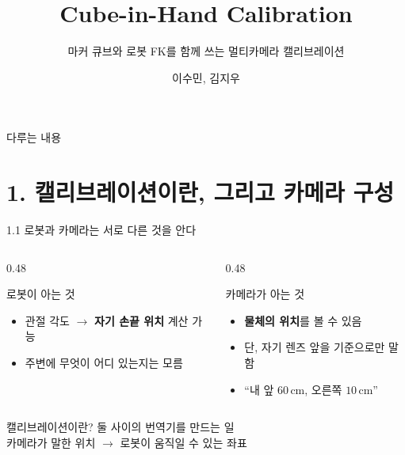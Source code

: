 \documentclass[aspectratio=169,11pt]{beamer}
\title[Cube-in-Hand Calibration]{Cube-in-Hand Calibration}
\subtitle{마커 큐브와 로봇 FK를 함께 쓰는 멀티카메라 캘리브레이션}
\author{이수민, 김지우}
\institute{}
\date{}
\begin{document}
\begin{frame}
  \titlepage
\end{frame}

\begin{frame}{다루는 내용}
  \tableofcontents
\end{frame}

\section{1. 캘리브레이션이란, 그리고 카메라 구성}

\begin{frame}{1.1 로봇과 카메라는 서로 다른 것을 안다}
  \begin{columns}[T]
    \begin{column}{0.48\textwidth}
      \begin{block}{로봇이 아는 것}
        \begin{minipage}[t][26mm][t]{\linewidth}
          \begin{itemize}
            \item 관절 각도 $\rightarrow$ \textbf{자기 손끝 위치} 계산 가능
            \item 주변에 무엇이 어디 있는지는 모름
          \end{itemize}
        \end{minipage}
      \end{block}
    \end{column}
    \begin{column}{0.48\textwidth}
      \begin{block}{카메라가 아는 것}
        \begin{minipage}[t][26mm][t]{\linewidth}
          \begin{itemize}
            \item \textbf{물체의 위치}를 볼 수 있음
            \item 단, 자기 렌즈 앞을 기준으로만 말함
            \item ``내 앞 $60\,\mathrm{cm}$, 오른쪽 $10\,\mathrm{cm}$''
          \end{itemize}
        \end{minipage}
      \end{block}
    \end{column}
  \end{columns}
  \vfill
  \begin{alertblock}{캘리브레이션이란?}
    둘 사이의 번역기를 만드는 일\\
    카메라가 말한 위치 $\rightarrow$ 로봇이 움직일 수 있는 좌표
  \end{alertblock}
\end{frame}
\end{document}
